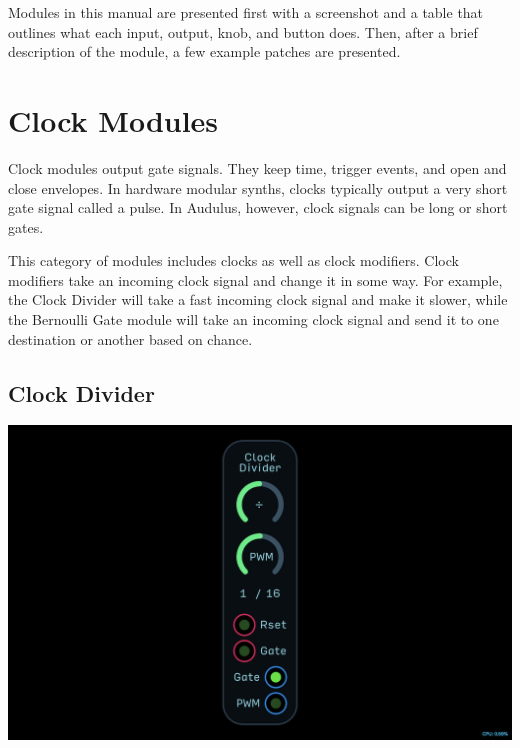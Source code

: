 \documentclass[11pt]{book}
\begin{document}
Modules in this manual are presented first with a screenshot and a table that outlines what each input, output, knob, and button does. Then, after a brief description of the module, a few example patches are presented.


\chapter{Clock Modules}

Clock modules output gate signals. They keep time, trigger events, and open and close envelopes. In hardware modular synths, clocks typically output a very short gate signal called a pulse. In Audulus, however, clock signals can be long or short gates.

This category of modules includes clocks as well as clock modifiers. Clock modifiers take an incoming clock signal and change it in some way. For example, the Clock Divider will take a fast incoming clock signal and make it slower, while the Bernoulli Gate module will take an incoming clock signal and send it to one destination or another based on chance.
\pagebreak


\section{Clock Divider}

\includegraphics[width=\textwidth]{clock-divider.png}
\end{document}
